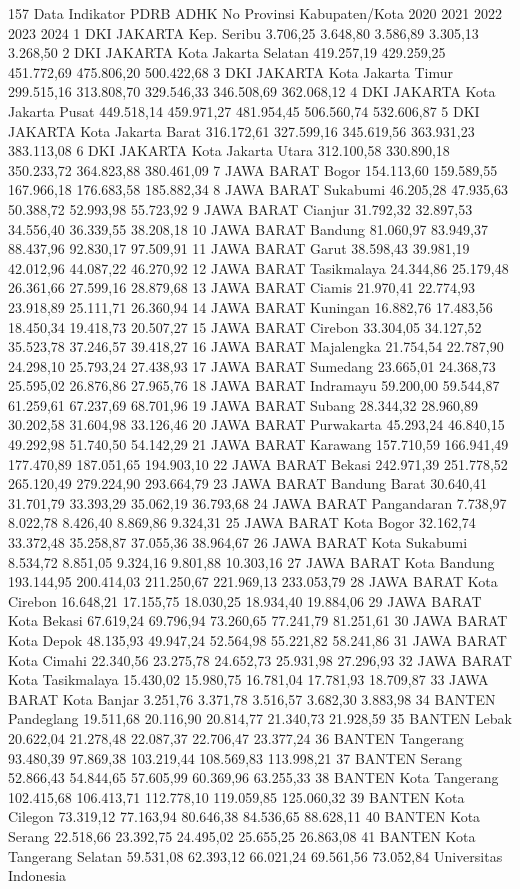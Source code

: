 157
Data Indikator PDRB ADHK
No Provinsi Kabupaten/Kota 2020 2021 2022 2023 2024
1 DKI JAKARTA Kep. Seribu 3.706,25 3.648,80 3.586,89 3.305,13 3.268,50
2 DKI JAKARTA Kota Jakarta Selatan 419.257,19 429.259,25 451.772,69 475.806,20 500.422,68
3 DKI JAKARTA Kota Jakarta Timur 299.515,16 313.808,70 329.546,33 346.508,69 362.068,12
4 DKI JAKARTA Kota Jakarta Pusat 449.518,14 459.971,27 481.954,45 506.560,74 532.606,87
5 DKI JAKARTA Kota Jakarta Barat 316.172,61 327.599,16 345.619,56 363.931,23 383.113,08
6 DKI JAKARTA Kota Jakarta Utara 312.100,58 330.890,18 350.233,72 364.823,88 380.461,09
7 JAWA BARAT Bogor 154.113,60 159.589,55 167.966,18 176.683,58 185.882,34
8 JAWA BARAT Sukabumi 46.205,28 47.935,63 50.388,72 52.993,98 55.723,92
9 JAWA BARAT Cianjur 31.792,32 32.897,53 34.556,40 36.339,55 38.208,18
10 JAWA BARAT Bandung 81.060,97 83.949,37 88.437,96 92.830,17 97.509,91
11 JAWA BARAT Garut 38.598,43 39.981,19 42.012,96 44.087,22 46.270,92
12 JAWA BARAT Tasikmalaya 24.344,86 25.179,48 26.361,66 27.599,16 28.879,68
13 JAWA BARAT Ciamis 21.970,41 22.774,93 23.918,89 25.111,71 26.360,94
14 JAWA BARAT Kuningan 16.882,76 17.483,56 18.450,34 19.418,73 20.507,27
15 JAWA BARAT Cirebon 33.304,05 34.127,52 35.523,78 37.246,57 39.418,27
16 JAWA BARAT Majalengka 21.754,54 22.787,90 24.298,10 25.793,24 27.438,93
17 JAWA BARAT Sumedang 23.665,01 24.368,73 25.595,02 26.876,86 27.965,76
18 JAWA BARAT Indramayu 59.200,00 59.544,87 61.259,61 67.237,69 68.701,96
19 JAWA BARAT Subang 28.344,32 28.960,89 30.202,58 31.604,98 33.126,46
20 JAWA BARAT Purwakarta 45.293,24 46.840,15 49.292,98 51.740,50 54.142,29
21 JAWA BARAT Karawang 157.710,59 166.941,49 177.470,89 187.051,65 194.903,10
22 JAWA BARAT Bekasi 242.971,39 251.778,52 265.120,49 279.224,90 293.664,79
23 JAWA BARAT Bandung Barat 30.640,41 31.701,79 33.393,29 35.062,19 36.793,68
24 JAWA BARAT Pangandaran 7.738,97 8.022,78 8.426,40 8.869,86 9.324,31
25 JAWA BARAT Kota Bogor 32.162,74 33.372,48 35.258,87 37.055,36 38.964,67
26 JAWA BARAT Kota Sukabumi 8.534,72 8.851,05 9.324,16 9.801,88 10.303,16
27 JAWA BARAT Kota Bandung 193.144,95 200.414,03 211.250,67 221.969,13 233.053,79
28 JAWA BARAT Kota Cirebon 16.648,21 17.155,75 18.030,25 18.934,40 19.884,06
29 JAWA BARAT Kota Bekasi 67.619,24 69.796,94 73.260,65 77.241,79 81.251,61
30 JAWA BARAT Kota Depok 48.135,93 49.947,24 52.564,98 55.221,82 58.241,86
31 JAWA BARAT Kota Cimahi 22.340,56 23.275,78 24.652,73 25.931,98 27.296,93
32 JAWA BARAT Kota Tasikmalaya 15.430,02 15.980,75 16.781,04 17.781,93 18.709,87
33 JAWA BARAT Kota Banjar 3.251,76 3.371,78 3.516,57 3.682,30 3.883,98
34 BANTEN Pandeglang 19.511,68 20.116,90 20.814,77 21.340,73 21.928,59
35 BANTEN Lebak 20.622,04 21.278,48 22.087,37 22.706,47 23.377,24
36 BANTEN Tangerang 93.480,39 97.869,38 103.219,44 108.569,83 113.998,21
37 BANTEN Serang 52.866,43 54.844,65 57.605,99 60.369,96 63.255,33
38 BANTEN Kota Tangerang 102.415,68 106.413,71 112.778,10 119.059,85 125.060,32
39 BANTEN Kota Cilegon 73.319,12 77.163,94 80.646,38 84.536,65 88.628,11
40 BANTEN Kota Serang 22.518,66 23.392,75 24.495,02 25.655,25 26.863,08
41 BANTEN Kota Tangerang Selatan 59.531,08 62.393,12 66.021,24 69.561,56 73.052,84
Universitas Indonesia

